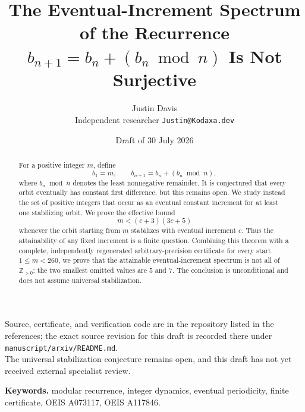 \documentclass[11pt]{article}
\title{\bfseries The Eventual-Increment Spectrum of the Recurrence
$b_{n+1}=b_n+(b_n\bmod n)$ Is Not Surjective}
\author{Justin Davis\\\small Independent researcher \quad \texttt{Justin@Kodaxa.dev}}
\date{Draft of 30 July 2026}
\theoremstyle{definition}
\theoremstyle{remark}
\newcommand{\Z}{\mathbb{Z}}
\begin{document}
\maketitle

\begin{center}
\small
Source, certificate, and verification code are in the repository listed in the
references; the exact source revision for this draft is recorded there under
\texttt{manuscript/arxiv/README.md}.\\
The universal stabilization conjecture remains open, and this draft has not yet received external specialist review.
\end{center}

\begin{abstract}
For a positive integer $m$, define
\[
 b_1=m,\qquad b_{n+1}=b_n+(b_n\bmod n),
\]
where $b_n\bmod n$ denotes the least nonnegative remainder. It is conjectured that every orbit eventually has constant first difference, but this remains open. We study instead the set of positive integers that occur as an eventual constant increment for at least one stabilizing orbit. We prove the effective bound
\[
 m<(c+3)(3c+5)
\]
whenever the orbit starting from $m$ stabilizes with eventual increment $c$. Thus the attainability of any fixed increment is a finite question. Combining this theorem with a complete, independently regenerated arbitrary-precision certificate for every start $1\le m<260$, we prove that the attainable eventual-increment spectrum is not all of $\Z_{>0}$: the two smallest omitted values are $5$ and $7$. The conclusion is unconditional and does not assume universal stabilization.
\end{abstract}

\noindent\textbf{Keywords.} modular recurrence, integer dynamics, eventual periodicity, finite certificate, OEIS A073117, OEIS A117846.











\end{document}
